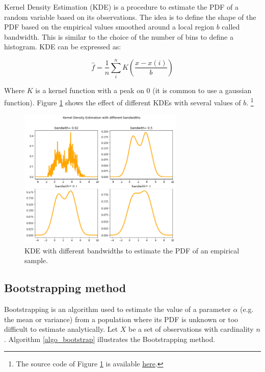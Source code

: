 Kernel Density Estimation (KDE) is a procedure to estimate the PDF of a random variable based on its observations. The idea is to define the shape of the PDF based on the empirical values smoothed around a local region $b$ called bandwidth. This is similar to the choice of the number of bins to define a histogram. KDE can be expressed as:

\begin{equation}
\hat{f}=\frac{1}{n}\sum_{i}^{n}K\left(\frac{x-x(i)}{b}\right)
\label{eq_KDE}
\end{equation}

Where $K$ is a kernel function with a peak on 0 (it is common to use a gaussian function). Figure \ref{fig_KDE} shows the effect of different KDEs with several values of $b$. \footnote{The source code of Figure \ref{fig_KDE} is available \href{https://github.com/aletuf93/logproj/blob/master/examples/03.\%20Statistics.ipynb}{here}.}

\begin{figure}[hbt!]
\centering
\includegraphics[width=0.7\textwidth]{SectionLetsMath/elemStat_figures/fig_KDE.png}
\captionsetup{type=figure}
\caption{KDE with different bandwidths to estimate the PDF of an empirical sample.}
\label{fig_KDE}
\end{figure}

\subsection{Bootstrapping method} \label{secBootstrapping}

Bootstrapping is an algorithm used to estimate the value of a parameter $\alpha$ (e.g. the mean or variance) from a population where its PDF is unknown or too difficult to estimate analytically.  Let $X$ be a set of observations with cardinality $n$. Algorithm \ref{algo_bootstrap} illustrates the Bootstrapping method.


